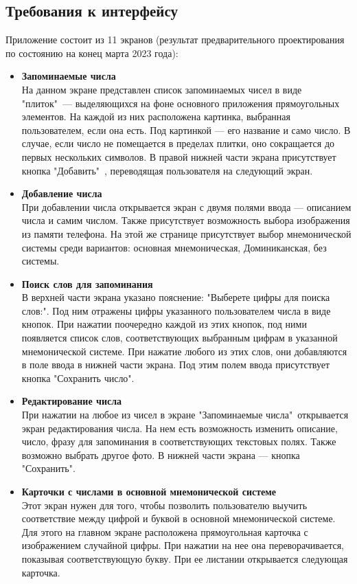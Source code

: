 \documentclass[draft]{article}
\begin{document}
\subsection{Требования к интерфейсу}
Приложение состоит из 11 экранов (результат предварительного проектирования по состоянию на конец марта 2023 года):
\begin{itemize}
\item \textbf{Запоминаемые числа}\\
На данном экране представлен список запоминаемых чисел в виде "{}плиток"{}\ — выделяющихся на фоне основного приложения прямоугольных элементов. На каждой из них расположена картинка, выбранная пользователем, если она есть. Под картинкой — его название и само число. В случае, если число не помещается в пределах плитки, оно сокращается до первых нескольких символов. В правой нижней части экрана присутствует кнопка "{}Добавить"{}\ , переводящая пользователя на следующий экран.
\item \textbf{Добавление числа}\\
При добавлении числа открывается экран с двумя полями ввода — описанием числа и самим числом. Также присутствует возможность выбора изображения из памяти телефона. На этой же странице присутствует выбор мнемонической системы среди вариантов: основная мнемоническая, Доминиканская, без системы.
\item \textbf{Поиск слов для запоминания}\\
В верхней части экрана указано пояснение: "{}Выберете цифры для поиска слов:"{}. Под ним отражены цифры указанного пользователем числа в виде кнопок. При нажатии поочередно каждой из этих кнопок, под ними появляется список слов, соответствующих выбранным цифрам в указанной мнемонической системе. При нажатие любого из этих слов, они добавляются в поле ввода в нижней части экрана. Под этим полем ввода присутствует кнопка "{}Сохранить число"{}.
\item \textbf{Редактирование числа}\\
При нажатии на любое из чисел в экране "{}Запоминаемые числа"{}\ открывается экран редактирования числа. На нем есть возможность изменить описание, число, фразу для запоминания в соответствующих текстовых полях. Также возможно выбрать другое фото. В нижней части экрана — кнопка "{}Сохранить"{}.
\item \textbf{Карточки с числами в основной мнемонической системе}\\
Этот экран нужен для того, чтобы позволить пользователю выучить соответствие между цифрой и буквой в основной мнемонической системе. Для этого на главном экране расположена прямоугольная карточка с изображением случайной цифры. При нажатии на нее она переворачивается, показывая соответствующую букву. При ее листании открывается следующая карточка.

\end{itemize}
\end{document}
